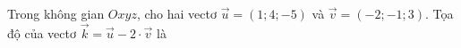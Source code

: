 \begin{ex}
Trong không gian $Oxyz$, cho hai vectơ $\vec u=(1;4;-5)$ và $\vec v=(-2;-1;3)$. Tọa độ của vectơ $\vec k=\vec u-2\cdot\vec v$ là
\end{ex}
